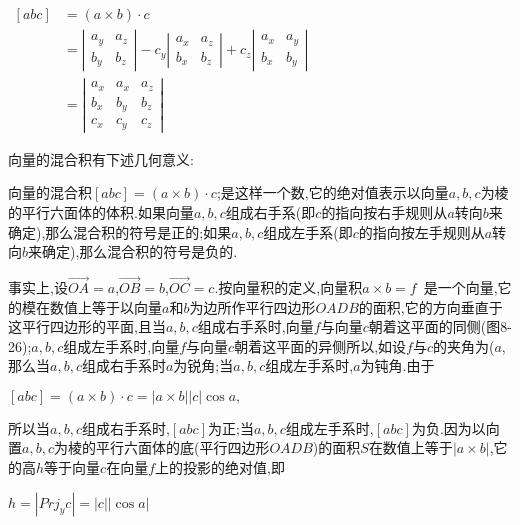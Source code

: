 \documentclass[oneside]{book}
\begin{document}
$\begin{aligned}[a b c] &=(a \times b) \cdot c \\ &=\left|\begin{array}{cc}{a_{y}} & {a_{z}} \\ {b_{y}} & {b_{z}}\end{array}\right|-c_{y}\left|\begin{array}{ll}{a_{x}} & {a_{z}} \\ {b_{x}} & {b_{z}}\end{array}\right|+c_{z}\left|\begin{array}{ll}{a_{x}} & {a_{y}} \\ {b_{x}} & {b_{y}}\end{array}\right| \\ &=\left|\begin{array}{lll}{a_{x}} & {a_{x}} & {a_{z}} \\ {b_{x}} & {b_{y}} & {b_{z}} \\ {c_{x}} & {c_{y}} & {c_{z}}\end{array}\right| \end{aligned}$

向量的混合积有下述几何意义:

向量的混合积$\left[ {abc} \right] = \left( {a \times b} \right) \cdot c$;是这样一个数,它的绝对值表示以向量$a,b,c$为棱的平行六面体的体积.如果向量$a,b,c$组成右手系(即$c$的指向按右手规则从$a$转向$b$来确定),那么混合积的符号是正的;如果$a,b,c$组成左手系(即$c$的指向按左手规则从$a$转向$b$来确定),那么混合积的符号是负的.

事实上,设$\overrightarrow {OA}  = a$,$\overrightarrow {OB}  = b$,$\overrightarrow {OC}  = c$.按向量积的定义,向量积$a \times b = f$~是一个向量,它的模在数值上等于以向量$a$和$b$为边所作平行四边形$OADB$的面积,它的方向垂直于这平行四边形的平面,且当$a,b,c$组成右手系时,向量$f$与向量$c$朝着这平面的同侧(图8-26);$a,b,c$组成左手系时,向量$f$与向量$c$朝着这平面的异侧所以,如设$f$与$c$的夹角为($a$,那么当$a,b,c$组成右手系时$a$为锐角;当$a,b,c$组成左手系时,$a$为钝角.由于

$\left[ {abc} \right] = \left( {a \times b} \right) \cdot c = \left| {a \times b} \right|\left| c \right|{{\cos}}a,$

所以当$a,b,c$组成右手系时,$[abc]$为正;当$a,b,c$组成左手系时,$[abc]$为负.因为以向置$a,b,c$为棱的平行六面体的底(平行四边形$OADB$)的面积$S$在数值上等于$|a \times b|$,它的高$h$等于向量$c$在向量$f$上的投影的绝对值,即

$h = |{{Pr}}{{{j}}_y}c| = \left| {c||{{\cos}}a} \right|$
\end{document}
